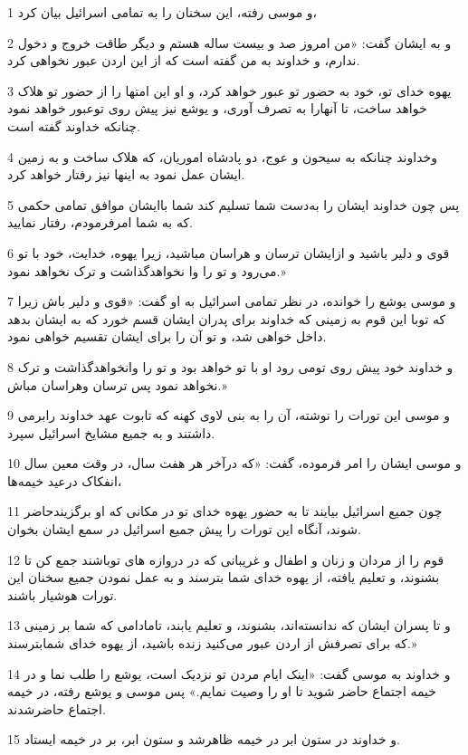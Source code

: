 \par 1 و موسی رفته، این سخنان را به تمامی اسرائیل بیان کرد،
\par 2 و به ایشان گفت: «من امروز صد و بیست ساله هستم و دیگر طاقت خروج و دخول ندارم، و خداوند به من گفته است که از این اردن عبور نخواهی کرد.
\par 3 یهوه خدای تو، خود به حضور تو عبور خواهد کرد، و او این امتها را از حضور تو هلاک خواهد ساخت، تا آنهارا به تصرف آوری، و یوشع نیز پیش روی توعبور خواهد نمود چنانکه خداوند گفته است.
\par 4 وخداوند چنانکه به سیحون و عوج، دو پادشاه اموریان، که هلاک ساخت و به زمین ایشان عمل نمود به اینها نیز رفتار خواهد کرد.
\par 5 پس چون خداوند ایشان را به‌دست شما تسلیم کند شما باایشان موافق تمامی حکمی که به شما امرفرمودم، رفتار نمایید.
\par 6 قوی و دلیر باشید و ازایشان ترسان و هراسان مباشید، زیرا یهوه، خدایت، خود با تو می‌رود و تو را وا نخواهدگذاشت و ترک نخواهد نمود.»
\par 7 و موسی یوشع را خوانده، در نظر تمامی اسرائیل به او گفت: «قوی و دلیر باش زیرا که توبا این قوم به زمینی که خداوند برای پدران ایشان قسم خورد که به ایشان بدهد داخل خواهی شد، و تو آن را برای ایشان تقسیم خواهی نمود.
\par 8 و خداوند خود پیش روی تومی رود او با تو خواهد بود و تو را وانخواهدگذاشت و ترک نخواهد نمود پس ترسان وهراسان مباش.»
\par 9 و موسی این تورات را نوشته، آن را به بنی لاوی کهنه که تابوت عهد خداوند رابرمی داشتند و به جمیع مشایخ اسرائیل سپرد.
\par 10 و موسی ایشان را امر فرموده، گفت: «که درآخر هر هفت سال، در وقت معین سال انفکاک درعید خیمه‌ها،
\par 11 چون جمیع اسرائیل بیایند تا به حضور یهوه خدای تو در مکانی که او برگزیندحاضر شوند، آنگاه این تورات را پیش جمیع اسرائیل در سمع ایشان بخوان.
\par 12 قوم را از مردان و زنان و اطفال و غریبانی که در دروازه های توباشند جمع کن تا بشنوند، و تعلیم یافته، از یهوه خدای شما بترسند و به عمل نمودن جمیع سخنان این تورات هوشیار باشند.
\par 13 و تا پسران ایشان که ندانسته‌اند، بشنوند، و تعلیم یابند، تامادامی که شما بر زمینی که برای تصرفش از اردن عبور می‌کنید زنده باشید، از یهوه خدای شمابترسند.»
\par 14 و خداوند به موسی گفت: «اینک ایام مردن تو نزدیک است، یوشع را طلب نما و در خیمه اجتماع حاضر شوید تا او را وصیت نمایم.» پس موسی و یوشع رفته، در خیمه اجتماع حاضرشدند.
\par 15 و خداوند در ستون ابر در خیمه ظاهرشد و ستون ابر، بر در خیمه ایستاد.
